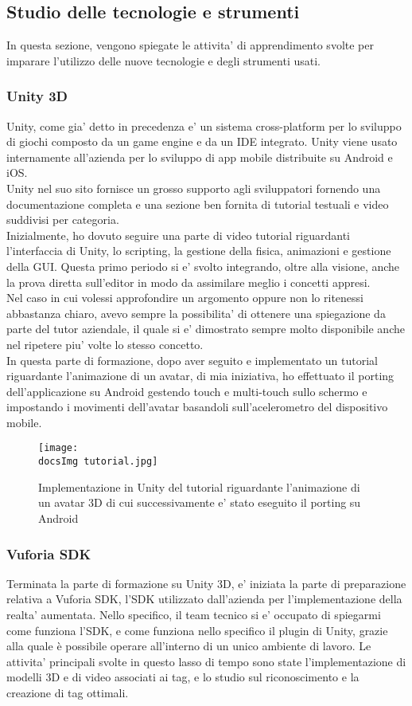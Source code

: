 \subsection{Studio delle tecnologie e strumenti}
In questa sezione, vengono spiegate le attivita' di apprendimento svolte per imparare l'utilizzo delle nuove tecnologie e degli strumenti usati.
\subsubsection{Unity 3D}
Unity, come gia' detto in precedenza e' un sistema cross-platform per lo sviluppo di giochi composto da un game engine e da un IDE integrato. Unity viene usato internamente all'azienda per lo sviluppo di app mobile distribuite su Android e iOS.
\\
Unity nel suo sito fornisce un grosso supporto agli sviluppatori fornendo una documentazione completa e una sezione ben fornita di tutorial testuali e video suddivisi per categoria.\\
Inizialmente, ho dovuto seguire una parte di video tutorial riguardanti l'interfaccia di Unity, lo scripting, la gestione della fisica, animazioni e gestione della GUI. Questa primo periodo si e' svolto integrando, oltre alla visione, anche la prova diretta sull'editor in modo da assimilare meglio i concetti appresi.\\
Nel caso in cui volessi approfondire un argomento oppure non lo ritenessi abbastanza chiaro, avevo sempre la possibilita' di ottenere una spiegazione da parte del tutor aziendale, il quale si e' dimostrato sempre molto disponibile anche nel ripetere piu' volte lo stesso concetto.\\
In questa parte di formazione, dopo aver seguito e implementato un tutorial riguardante l'animazione di un avatar, di mia iniziativa, ho effettuato il porting dell'applicazione su Android gestendo touch e multi-touch sullo schermo e impostando i movimenti dell'avatar basandoli sull'acelerometro del dispositivo mobile.

\begin{figure}[H]
	\centering
	\texttt{[image: \\docsImg tutorial.jpg]}
	\caption{Implementazione in Unity del tutorial riguardante l'animazione di un avatar 3D di cui successivamente e' stato eseguito il porting su Android}
	\label{fig:tutorial riguardante l'animazione di un avatar 3D}
\end{figure}
 
\subsubsection{Vuforia SDK}
Terminata la parte di formazione su Unity 3D, e' iniziata la parte di preparazione relativa a Vuforia SDK, l'SDK utilizzato dall'azienda per l'implementazione della realta' aumentata. Nello specifico, il team tecnico si e' occupato di spiegarmi come funziona l'SDK, e come funziona nello specifico il plugin di Unity, grazie alla quale è possibile operare all’interno di un unico ambiente di lavoro. Le attivita' principali svolte in questo lasso di tempo sono state l'implementazione di modelli 3D e di video associati ai tag, e lo studio sul riconoscimento e la creazione di tag ottimali.

